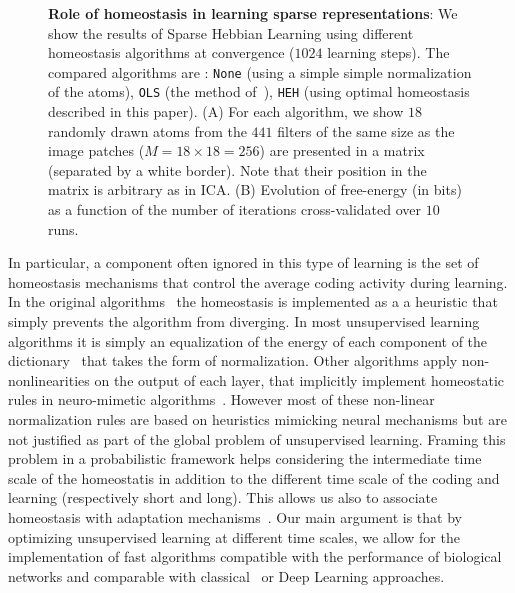 \documentclass[draft]{article} %
\begin{document}
\begin{figure}%
\caption{
{\bf Role of homeostasis in learning sparse representations}:
We show the results of Sparse Hebbian Learning using different homeostasis algorithms at convergence ($1024$ learning steps). The compared algorithms are :  \texttt{None} (using a simple simple normalization of the atoms), \texttt{OLS} (the method of~\citep{Olshausen97}), \texttt{HEH} (using optimal homeostasis described in this paper). {\sf (A)} For each algorithm, we show $18$ randomly drawn atoms from the $441$ filters of the same size as the image patches ($M= 18 \times 18=256$) are presented in a matrix (separated by a white border). Note that their position in the matrix is arbitrary as in ICA. {\sf (B)} Evolution of free-energy (in bits) as a function of the number of iterations cross-validated over $10$ runs. %
\label{fig:map}}%
\end{figure}%
In particular, a component often ignored in this type of learning is the set of homeostasis mechanisms that control the average coding activity during learning. %
In the original algorithms~\citep{Olshausen97} the homeostasis is implemented as a a heuristic that simply prevents the algorithm from diverging. In most unsupervised learning algorithms it is simply an equalization of the energy of each component of the dictionary~\citep{Mairal14} that takes the form of  normalization. Other algorithms apply non-nonlinearities on the output of each layer, that implicitly implement homeostatic rules in neuro-mimetic algorithms~\citep{Brito16}. However most of these non-linear normalization rules are based on heuristics mimicking neural mechanisms but are not justified as part of the global problem of unsupervised learning.  Framing this problem in a probabilistic framework helps considering the intermediate time scale of the homeostatis in addition to the different time scale of the coding and learning (respectively short and long). This allows us also to associate homeostasis with adaptation mechanisms~\citep{Rao99}. Our main argument is that by optimizing unsupervised learning at different time scales, we allow for the implementation of fast algorithms compatible with the performance of biological networks and comparable with classical~\citep{Olshausen97} or Deep Learning approaches.
\end{document}
